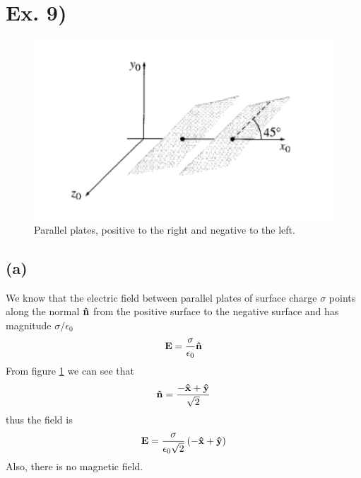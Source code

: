 \documentclass[oneside, 10pt, notitlepage]{book}
\begin{document}
\section*{Ex. 9)}

\begin{figure}[H]
    \centering
    \includegraphics[width = 0.7 \textwidth]{L14_9}
    \caption{Parallel plates, positive to the right and negative to the left.}
    \label{fig:L14_9}
\end{figure}

\subsection*{(a)}

We know that the electric field between parallel plates of surface charge \(\sigma\) points along the normal \(\vu{n}\) from the positive surface to the negative surface and has magnitude \(\sigma/\epsilon_0\)
\begin{equation}
    \vb{E} = \frac{\sigma}{\epsilon_0}\vu{n}
\end{equation}
From figure \ref{fig:L14_9} we can see that
\begin{equation}
    \vu{n} = \frac{-\vu{x}+\vu{y}}{\sqrt{2}}
\end{equation}
thus the field is
\begin{equation}
    \vb{E} = \frac{\sigma}{\epsilon_0\sqrt{2}}\left(-\vu{x}+\vu{y}\right)
\end{equation}
Also, there is no magnetic field. 
\end{document}
